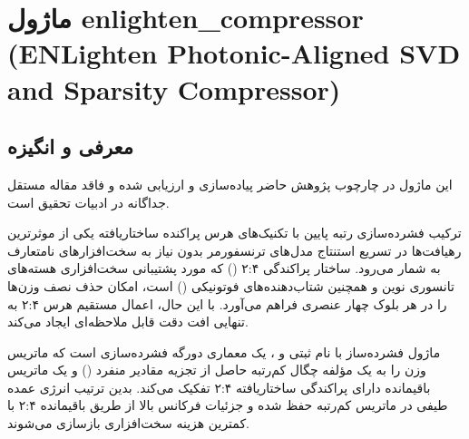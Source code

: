 \section{ماژول enlighten\_compressor (ENLighten Photonic-Aligned SVD and Sparsity Compressor)}
\label{sec:module_enlighten_compressor}

\subsection{معرفی و انگیزه}
این ماژول در چارچوب پژوهش حاضر پیاده‌سازی و ارزیابی شده و فاقد مقاله مستقل جداگانه در ادبیات تحقیق است.

ترکیب فشرده‌سازی رتبه پایین با تکنیک‌های هرس پراکنده ساختاریافته یکی از موثرترین رهیافت‌ها در تسریع استنتاج مدل‌های ترنسفورمر بدون نیاز به سخت‌افزارهای نامتعارف به شمار می‌رود. ساختار پراکندگی ۲:۴ () که مورد پشتیبانی سخت‌افزاری هسته‌های تانسوری نوین و همچنین شتاب‌دهنده‌های فوتونیکی () است، امکان حذف نصف وزن‌ها را در هر بلوک چهار عنصری فراهم می‌آورد. با این حال، اعمال مستقیم هرس ۲:۴ به تنهایی افت دقت قابل ملاحظه‌ای ایجاد می‌کند.

ماژول فشرده‌ساز  با نام ثبتی  و ، یک معماری دورگه فشرده‌سازی است که ماتریس وزن را به یک مؤلفه چگال کم‌رتبه حاصل از تجزیه مقادیر منفرد () و یک ماتریس باقیمانده دارای پراکندگی ساختاریافته ۲:۴ تفکیک می‌کند. بدین ترتیب انرژی عمده طیفی در ماتریس کم‌رتبه حفظ شده و جزئیات فرکانس بالا از طریق باقیمانده ۲:۴ با کمترین هزینه سخت‌افزاری بازسازی می‌شوند.

